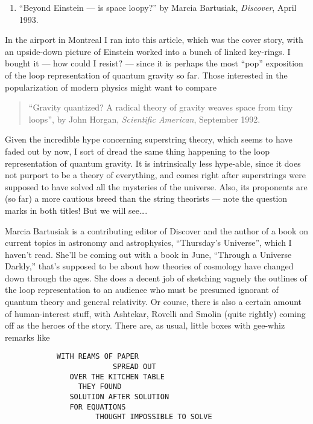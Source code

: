 \documentclass{article}
\def\tightlist{}
\begin{document}
\begin{enumerate}
\def\labelenumi{\arabic{enumi})}
\tightlist
\item
  ``Beyond Einstein --- is space loopy?'' by Marcia Bartusiak,
  \emph{Discover}, April 1993.
\end{enumerate}

In the airport in Montreal I ran into this article, which was the cover
story, with an upside-down picture of Einstein worked into a bunch of
linked key-rings. I bought it --- how could I resist? --- since it is
perhaps the most ``pop'' exposition of the loop representation of
quantum gravity so far. Those interested in the popularization of modern
physics might want to compare

\begin{quote}
``Gravity quantized? A radical theory of gravity weaves space from tiny
loops'', by John Horgan, \emph{Scientific American}, September 1992.
\end{quote}

Given the incredible hype concerning superstring theory, which seems to
have faded out by now, I sort of dread the same thing happening to the
loop representation of quantum gravity. It is intrinsically less
hype-able, since it does not purport to be a theory of everything, and
comes right after superstrings were supposed to have solved all the
mysteries of the universe. Also, its proponents are (so far) a more
cautious breed than the string theorists --- note the question marks in
both titles! But we will see\ldots.

Marcia Bartusiak is a contributing editor of Discover and the author of
a book on current topics in astronomy and astrophysics, ``Thursday's
Universe'', which I haven't read. She'll be coming out with a book in
June, ``Through a Universe Darkly,'' that's supposed to be about how
theories of cosmology have changed down through the ages. She does a
decent job of sketching vaguely the outlines of the loop representation
to an audience who must be presumed ignorant of quantum theory and
general relativity. Or course, there is also a certain amount of
human-interest stuff, with Ashtekar, Rovelli and Smolin (quite rightly)
coming off as the heroes of the story. There are, as usual, little boxes
with gee-whiz remarks like

\begin{verbatim}
            WITH REAMS OF PAPER
                         SPREAD OUT
               OVER THE KITCHEN TABLE
                 THEY FOUND
               SOLUTION AFTER SOLUTION
               FOR EQUATIONS
                     THOUGHT IMPOSSIBLE TO SOLVE
\end{verbatim}
\end{document}
